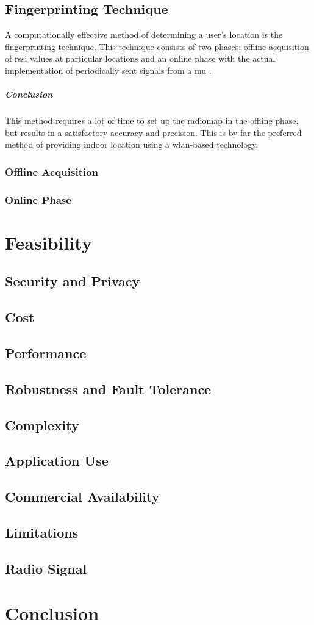 \subsection{Fingerprinting Technique}
A computationally effective method of determining a user's location is the fingerprinting technique. This technique consists of two phases: offline acquisition of \acrshort{rssi} values at particular locations and an online phase with the actual implementation of periodically sent signals from a \acrshort{mu} \cite[p.~9]{Retscher}.
\subparagraph{Conclusion}
This method requires a lot of time to set up the radiomap in the offline phase, but results in a satisfactory accuracy and precision. This is by far the preferred method of providing indoor location using a \acrshort{wlan}-based technology.
\subsubsection{Offline Acquisition}
\subsubsection{Online Phase}
\section{Feasibility}
\subsection{Security and Privacy}
\subsection{Cost}
\subsection{Performance}
\subsection{Robustness and Fault Tolerance}
\subsection{Complexity}
\subsection{Application Use}
\subsection{Commercial Availability}
\subsection{Limitations}

\subsection{Radio Signal}
\section{Conclusion}
